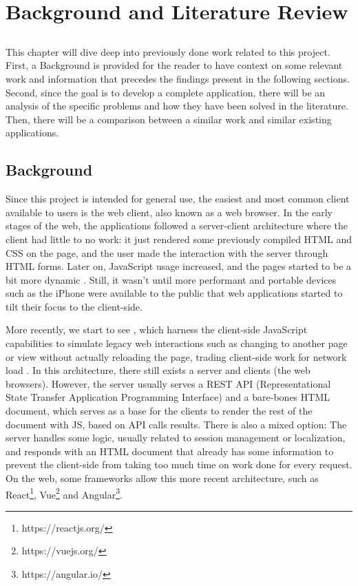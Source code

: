 
\chapter{Background and Literature Review} \label{chap:sota}

\section*{}

This chapter will dive deep into previously done work related to this project. First, a Background is provided for the reader to have context on some relevant work and information that precedes the findings present in the following sections. Second, since the goal is to develop a complete application, there will be an analysis of the specific problems and how they have been solved in the literature. Then, there will be a comparison between a similar work and similar existing applications.

\section{Background}

Since this project is intended for general use, the easiest and most common client available to users is the web client, also known as a web browser. In the early stages of the web, the applications followed a server-client architecture where the client had little to no work: it just rendered some previously compiled HTML and CSS on the page, and the user made the interaction with the server through HTML forms. Later on, JavaScript usage increased, and the pages started to be a bit more dynamic \cite{ShklarRosen09}. Still, it wasn't until more performant and portable devices such as the iPhone were available to the public that web applications started to tilt their focus to the client-side. 

More recently, we start to see , which harness the client-side JavaScript capabilities to simulate legacy web interactions such as changing to another page or view without actually reloading the page, trading client-side work for network load \cite{Lugo-Cordero2015} \cite{Derezinska2020} \cite{Mesbah2007} \cite{Mesbah2007a}. In this architecture, there still exists a server and clients (the web browsers). However, the server usually serves a REST API (Representational State Transfer Application Programming Interface) and a bare-bones HTML document, which serves as a base for the clients to render the rest of the document with JS, based on API calls results. There is also a mixed option: The server handles some logic, usually related to session management or localization, and responds with an HTML document that already has some information to prevent the client-side from taking too much time on work done for every request. On the web, some frameworks allow this more recent architecture, such as React\footnote{https://reactjs.org/}, Vue\footnote{https://vuejs.org/} and Angular\footnote{https://angular.io/}.

